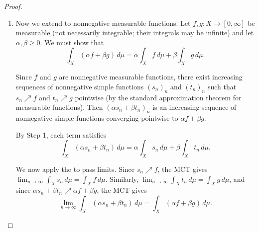 \begin{proof}
\begin{enumerate}
    By the definition of the Lebesgue integral of a simple function in , we compute
    $$\int_X (\alpha s + \beta t)\,d\mu = \sum_{i=1}^m \sum_{j=1}^n (\alpha a_i + \beta b_j) \mu(C_{ij}).$$

    We split this double sum:
    $$\sum_{i=1}^m \sum_{j=1}^n (\alpha a_i + \beta b_j)\mu(C_{ij}) = \alpha \sum_{i=1}^m \sum_{j=1}^n a_i \mu(C_{ij}) + \beta \sum_{i=1}^m \sum_{j=1}^n b_j \mu(C_{ij}).$$

    For the first term, we use that $\{C_{ij}\}_{j}$ is a partition of $A_i$ (since $\{B_j\}_j$ partitions $X$ and $A_i = \bigcup_j C_{ij}$), so $$\sum_{j=1}^n \mu(C_{ij}) = \mu(A_i).$$ Hence
    $$\alpha \sum_{i=1}^m a_i \left(\sum_{j=1}^n \mu(C_{ij})\right) = \alpha \sum_{i=1}^m a_i \mu(A_i) = \alpha \int_X s\,d\mu.$$
    Similarly for the second term: $\{C_{ij}\}_i$ partitions $B_j$, so $$\beta \sum_{j=1}^n b_j \left(\sum_{i=1}^m \mu(C_{ij})\right) = \beta \sum_{j=1}^n b_j \mu(B_j) = \beta \int_X t\,d\mu.$$

    This proves linearity for nonnegative simple functions with nonnegative coefficients:
    $$\int_X (\alpha s + \beta t)\,d\mu = \alpha \int_X s\,d\mu + \beta \int_X t\,d\mu.$$

    \item Now we extend to nonnegative measurable functions. Let $f,g : X \to [0,\infty]$ be measurable (not necessarily integrable; their integrals may be infinite) and let $\alpha,\beta \geq 0$. We must show that
    $$\int_X (\alpha f + \beta g)\,d\mu = \alpha \int_X f\,d\mu + \beta \int_X g\,d\mu.$$

    Since $f$ and $g$ are nonnegative measurable functions, there exist increasing sequences of nonnegative simple functions $(s_n)_n$ and $(t_n)_n$ such that $s_n \nearrow f$ and $t_n \nearrow g$ pointwise (by the standard approximation theorem for measurable functions). Then $(\alpha s_n + \beta t_n)_n$ is an increasing sequence of nonnegative simple functions converging pointwise to $\alpha f + \beta g$.

    By Step 1, each term satisfies $$\int_X (\alpha s_n + \beta t_n)\,d\mu = \alpha \int_X s_n\,d\mu + \beta \int_X t_n\,d\mu.$$

    We now apply the  to pass limits. Since $s_n \nearrow f$, the MCT gives $\lim_{n\to\infty}\int_X s_n\,d\mu = \int_X f\,d\mu$. Similarly, $\lim_{n\to\infty}\int_X t_n\,d\mu = \int_X g\,d\mu$, and since $\alpha s_n + \beta t_n \nearrow \alpha f + \beta g$, the MCT gives $$\lim_{n\to\infty} \int_X (\alpha s_n + \beta t_n)\,d\mu = \int_X (\alpha f + \beta g)\,d\mu.$$


\end{enumerate}
\end{proof}
